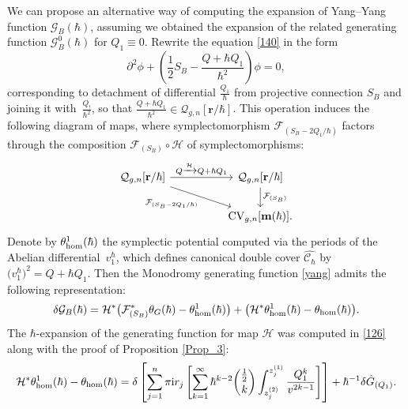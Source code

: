 \documentclass[pdftex]{sigma}
\numberwithin{equation}{section}
\theoremstyle{definition}
\begin{document}
We can propose an alternative way of computing the expansion of Yang--Yang function $\mathcal{G}_{B}(\hbar)$, assuming we obtained the expansion of the related generating function $\mathcal{G}^0_{B}(\hbar)$ for $Q_1 \equiv 0.$ Rewrite the equation \eqref{140} in the form
\begin{equation*}\partial^2\phi+\left(\frac{1}{2}S_B-\frac{Q+ \hbar Q_1}{\hbar^2}\right)\phi=0,\end{equation*}
corresponding to detachment of differential $\frac{Q_1}{\hbar}$ from projective connection $S_B$ and joining it with~$\frac{Q_!}{\hbar^2}$, so that $\frac{Q+ \hbar Q_1}{\hbar^2} \in \mathcal{Q}_{g,n}[\mathbf{r}/\hbar]$. This operation induces the following diagram of maps, where symplectomorphism $\mathcal{F}_{(S_B-{2Q_1}/{\hbar})}$ factors through the composition $\mathcal{F}_{(S_B)} \circ \mathcal{H} $ of symplectomorphisms:
\[
 \begin{tikzcd}
{\mathcal{Q}_{g,n}[\mathbf{r}/\hbar]} \arrow[rr, " Q \xrightarrow{\mathcal{H}} Q+\hbar Q_1"] \arrow[rrd, "\mathcal{F}_{(S_B-{2Q_1}/{\hbar})}"'] & & {\mathcal{Q}_{g,n}[\mathbf{r}/\hbar] \ar[d, "\mathcal{F}_{(S_B)}"]} \\
 & & {{\rm CV}_{g,n}[\mathbf{m}(\hbar)].}
\end{tikzcd}
\]
Denote by $\theta^{1}_{{\rm hom}}(\hbar)$ the symplectic potential computed
via the periods of the Abelian differential~$v^\hbar_1$, which defines canonical double cover $\hat{\mathcal{C}_\hbar}$ by $\big(v^\hbar_{1}\big)^2=Q+\hbar Q_1$. Then the Monodromy generating function \eqref{yang} admits the following representation:
\begin{equation*} \delta \mathcal{G}_{B}(\hbar)=\mathcal{H}^*\big(\mathcal{F}_{(S_B)}^*\theta_{G}(\hbar)-\theta^{1}_{{\rm hom}}(\hbar)\big)+\big(\mathcal{H}^*\theta^{1}_{{\rm hom}}(\hbar)-\theta_{{\rm hom}}(\hbar)\big). \end{equation*}
The $\hbar$-expansion of the generating function for map $\mathcal{H}$ was computed in \eqref{126} along with the proof of Proposition \ref{Prop_3}:
\begin{equation*}\mathcal{H}^*\theta^{1}_{{\rm hom}}(\hbar)-\theta_{{\rm hom}}(\hbar)=\delta\left[\sum^n_{j=1}
\pi{\rm i} r_j \left[\sum^{\infty}_{k=1}\hbar^{k-2}\binom{\frac{1}{2}}{k}\int^{z^{(1)}_j}_{z^{(2)}_j}\frac{{Q^k_1}}{v^{2k-1}} \right]\right] + \hbar^{-1} \delta\Hat{G}_{(Q_1)}. \end{equation*}
\end{document}
